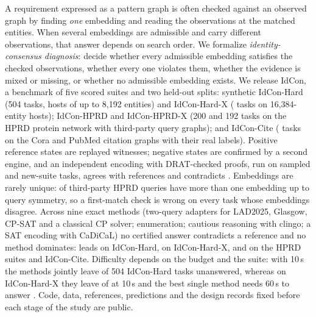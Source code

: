 A requirement expressed as a pattern graph is often checked against an observed graph by finding \emph{one} embedding and reading the observations at the matched entities. When several embeddings are admissible and carry different observations, that answer depends on search order. We formalize \emph{identity-consensus diagnosis}: decide whether every admissible embedding satisfies the checked observations, whether every one violates them, whether the evidence is mixed or missing, or whether no admissible embedding exists. We release IdCon, a benchmark of five scored suites and two held-out splits: synthetic IdCon-Hard (504 tasks, hosts of up to 8,192 entities) and IdCon-Hard-X (\hardxTasks{} tasks on 16,384-entity hosts); IdCon-HPRD and IdCon-HPRD-X (200 and 192 tasks on the HPRD protein network with third-party query graphs); and IdCon-Cite (\citeTasks{} tasks on the Cora and PubMed citation graphs with their real labels). Positive reference states are replayed witnesses; negative states are confirmed by a second engine, and an independent encoding with DRAT-checked proofs, run on \idcTasks{} sampled and new-suite tasks, agrees with \idcAgree{} references and contradicts \idcDisagree{}. Embeddings are rarely unique: \hprdAutoOrbitMulti{} of \hprdCountFullQueries{} third-party HPRD queries have more than one embedding up to query symmetry, so a first-match check is wrong on every task whose embeddings disagree. Across nine exact methods (two-query adapters for LAD2025, Glasgow, CP-SAT and a classical CP solver; enumeration; cautious reasoning with clingo; a SAT encoding with CaDiCaL) no certified answer contradicts a reference and no method dominates: \hardBest{} leads on IdCon-Hard, \hardxBest{} on IdCon-Hard-X, and \hprdBest{} on the HPRD suites and IdCon-Cite. Difficulty depends on the budget and the suite: with 10\,s the methods jointly leave \hardVBSAllUnsolvedTen{} of 504 IdCon-Hard tasks unanswered, whereas on IdCon-Hard-X they leave \hardxVBSUnsolvedTen{} of \hardxComplete{} at 10\,s and the best single method needs 60\,s to answer \hardxBestSingleSixtyN{}. Code, data, references, predictions and the design records fixed before each stage of the study are public.
